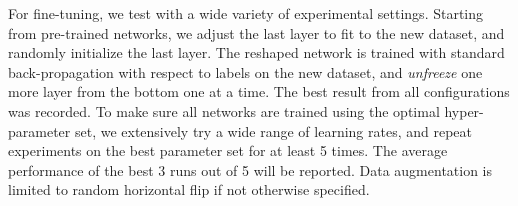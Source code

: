 \documentclass[journal]{IEEEtran}
\begin{document}
For fine-tuning, we test with a wide variety of experimental settings. Starting from pre-trained networks, we adjust the last layer to fit to the new dataset, and randomly initialize the last layer. The reshaped network is trained with standard back-propagation with respect to labels on the new dataset, and \textit{unfreeze} one more layer from the bottom one at a time. The best result from all configurations was recorded. 
To make sure all networks are trained using the optimal hyper-parameter set, we extensively try a wide range of learning rates, and repeat experiments on the best parameter set for at least 5 times. The average performance of the best 3 runs out of 5 will be reported.  Data augmentation is limited to random horizontal flip if not otherwise specified.

\end{document}
